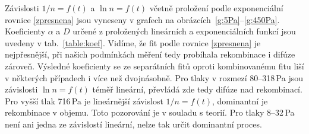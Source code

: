 \documentclass[a4paper,12pt]{article}
\begin{document}
Závislosti $1/n = f(t)$ a $\ln n = f(t)$ včetně proložení podle exponenciální 
rovnice 
\eqref{zpresnena} jsou vyneseny v grafech na obrázcích~\ref{g:5Pa}--\ref{g:450Pa}. 
Koeficienty $\alpha$ a $D$ určené z proložených lineárních a exponenciálních funkcí jsou 
uvedeny v tab.~\ref{table:koef}. Vidíme, že fit podle rovnice 
\ref{zpresnena} je nejpřesnější, při našich podmínkách měření tedy probíhala 
rekombinace i difúze zároveň. Výsledné koeficienty se ze separátních fitů oproti 
kombinovanému fitu liší v některých případech i více než dvojnásobně. Pro 
tlaky v rozmezí 80--318\,Pa jsou závislosti $\ln n = f(t)$ téměř lineární, 
převládá zde tedy difúze nad rekombinací. Pro vyšší tlak 716\,Pa je lineárnější 
závislost $1/n = f(t)$, dominantní je rekombinace v objemu. Toto pozorování je 
v souladu s teorií. Pro tlaky 8--32\,Pa není ani jedna ze závislostí lineární, 
nelze tak určit dominantní proces. 
\end{document}
